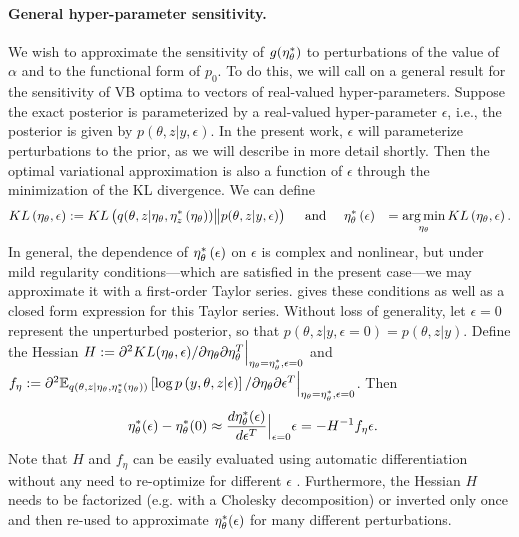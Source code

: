 
\paragraph{General hyper-parameter sensitivity.}
%
We wish to approximate the sensitivity of $g(\eta_\theta^{*})$ to perturbations of the
value of $\alpha$ and to the functional form of $p_{0}$.  To do this, we will
call on a general result for the sensitivity of VB optima to vectors of
real-valued hyper-parameters.  Suppose the exact posterior is parameterized by a
real-valued hyper-parameter $\epsilon$, i.e., the posterior is given by
$p\left(\theta, z \vert y, \epsilon\right)$. In the present work, $\epsilon$
will parameterize perturbations to the prior, as we will describe in more detail
shortly.  Then the optimal variational approximation is also a function of
$\epsilon$ through the minimization of the KL divergence.  We can define
%
\begin{align}
KL\left(\eta_\theta, \epsilon\right) &:=
    KL\left(q(\theta, z \vert \eta_\theta, \etazopt\left(\eta_\theta\right))
    \big\| p(\theta, z | y, \epsilon) \right) %
\quad\textrm{ and }\quad
\etathetaopt\left(\epsilon\right) &=
    \argmin_{\eta_\theta} KL\left(\eta_\theta, \epsilon\right).
    \label{eq:pert_kl_objective}
\end{align}
%
In general, the dependence of $\eta_\theta^{*}\left(\epsilon\right)$ on $\epsilon$
is complex and nonlinear, but under mild regularity conditions---which are
satisfied in the present case---we may approximate it with a first-order Taylor
series. \citet[Theorem 2]{giordano:2017:covariances} gives these conditions as
well as  a closed form expression for this Taylor series. Without loss of
generality, let $\epsilon=0$ represent the unperturbed posterior, so that
$p\left(\theta, z \vert y, \epsilon=0\right) = p\left(\theta, z \vert y
\right)$.
%
Define the Hessian
$H := \partial^2 KL(\eta_\theta, \epsilon) /
    \partial \eta_\theta \partial \eta_\theta^T
    \Big\rvert_{\eta_\theta = \eta_\theta^{*}, \epsilon = 0}$ and
$f_\eta := \partial^2
    \mathbb{E}_{q\left(\theta, z \vert \eta_\theta, \eta_z^{*}(\eta_\theta)\right)} \left[ \log p\left(y, \theta, z \vert \epsilon \right) \right]
    / \partial \eta_\theta \partial \epsilon^T
    \Big\rvert_{\eta_\theta = \eta_\theta^{*}, \epsilon = 0}$.
Then
%
\begin{align}
\eta_\theta^{*}(\epsilon)  -  \eta_\theta^{*}(0) &\approx
\frac{d \eta_\theta^{*}(\epsilon)}{d\epsilon^T}\Big|_{\epsilon=0} \epsilon =
- H^{-1} f_\eta \epsilon.
\label{eq:our_approximation}
\end{align}
%
Note that $H$ and $f_\eta$ can be easily evaluated using automatic
differentiation without any need to re-optimize for different $\epsilon$
\citep{maclaurin:2015:autograd}.  Furthermore,
the Hessian $H$ needs to be factorized (e.g. with a Cholesky decomposition) or
inverted only once and then re-used to approximate $\eta_\theta^{*}(\epsilon)$ for
many different perturbations.

